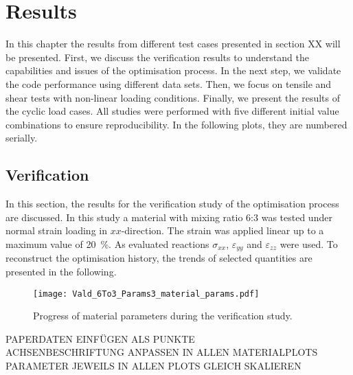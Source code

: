     \chapter{Results}\label{chap: results}

In this chapter the results from different test cases presented in section XX will be presented. First, we discuss the verification results to understand the capabilities and issues of the optimisation process. In the next step, we validate the code performance using different data sets. Then, we focus on tensile and shear tests with non-linear loading conditions. 
Finally, we present the results of the cyclic load cases. All studies were performed with five different initial value combinations to ensure reproducibility. In the following plots, they are numbered serially. 


\section{Verification}\label{sec: verification}

In this section, the results for the verification study of the optimisation process are discussed. In this study a material with mixing ratio 6:3 was tested under normal strain loading in $xx$-direction. The strain was applied linear up to a maximum value of 20 \%. As evaluated reactions $\sigma_{xx}$, $\varepsilon_{yy}$ and $\varepsilon_{zz}$ were used. To reconstruct the optimisation history, the trends of selected quantities are presented in the following.

\begin{figure}[H]
    \centering
    \texttt{[image: Vald\_6To3\_Params3\_material\_params.pdf]}
    \caption{Progress of material parameters during the verification study.}
    \label{fig:verifMaterialParams}
\end{figure}
PAPERDATEN EINFÜGEN ALS PUNKTE \\
ACHSENBESCHRIFTUNG ANPASSEN IN ALLEN MATERIALPLOTS \\
PARAMETER JEWEILS IN ALLEN PLOTS GLEICH SKALIEREN \\


